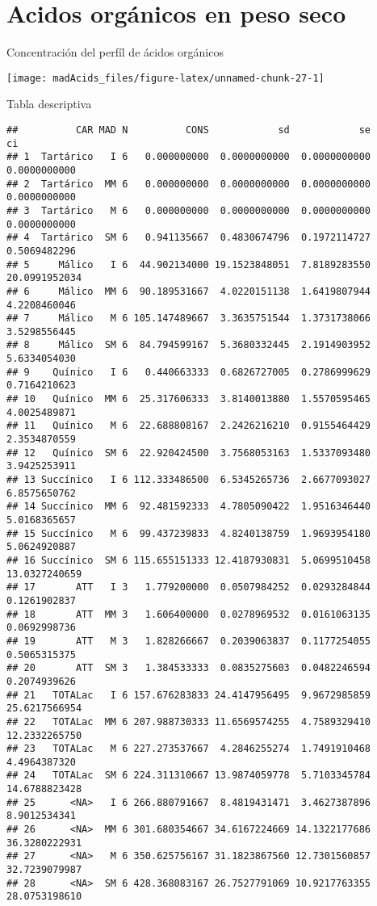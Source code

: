 \documentclass[
]{article}
\begin{document}
\section{Acidos orgánicos en peso
seco}\label{acidos-orguxe1nicos-en-peso-seco}

Concentración del perfíl de ácidos orgánicos

\begin{center}\texttt{[image: madAcids\_files/figure-latex/unnamed-chunk-27-1]} \end{center}

Tabla descriptiva

\begin{verbatim}
##          CAR MAD N          CONS            sd            se            ci
## 1  Tartárico   I 6   0.000000000  0.0000000000  0.0000000000  0.0000000000
## 2  Tartárico  MM 6   0.000000000  0.0000000000  0.0000000000  0.0000000000
## 3  Tartárico   M 6   0.000000000  0.0000000000  0.0000000000  0.0000000000
## 4  Tartárico  SM 6   0.941135667  0.4830674796  0.1972114727  0.5069482296
## 5     Málico   I 6  44.902134000 19.1523848051  7.8189283550 20.0991952034
## 6     Málico  MM 6  90.189531667  4.0220151138  1.6419807944  4.2208460046
## 7     Málico   M 6 105.147489667  3.3635751544  1.3731738066  3.5298556445
## 8     Málico  SM 6  84.794599167  5.3680332445  2.1914903952  5.6334054030
## 9    Quínico   I 6   0.440663333  0.6826727005  0.2786999629  0.7164210623
## 10   Quínico  MM 6  25.317606333  3.8140013880  1.5570595465  4.0025489871
## 11   Quínico   M 6  22.688808167  2.2426216210  0.9155464429  2.3534870559
## 12   Quínico  SM 6  22.920424500  3.7568053163  1.5337093480  3.9425253911
## 13 Succínico   I 6 112.333486500  6.5345265736  2.6677093027  6.8575650762
## 14 Succínico  MM 6  92.481592333  4.7805090422  1.9516346440  5.0168365657
## 15 Succínico   M 6  99.437239833  4.8240138759  1.9693954180  5.0624920887
## 16 Succínico  SM 6 115.655151333 12.4187930831  5.0699510458 13.0327240659
## 17       ATT   I 3   1.779200000  0.0507984252  0.0293284844  0.1261902837
## 18       ATT  MM 3   1.606400000  0.0278969532  0.0161063135  0.0692998736
## 19       ATT   M 3   1.828266667  0.2039063837  0.1177254055  0.5065315375
## 20       ATT  SM 3   1.384533333  0.0835275603  0.0482246594  0.2074939626
## 21   TOTALac   I 6 157.676283833 24.4147956495  9.9672985859 25.6217566954
## 22   TOTALac  MM 6 207.988730333 11.6569574255  4.7589329410 12.2332265750
## 23   TOTALac   M 6 227.273537667  4.2846255274  1.7491910468  4.4964387320
## 24   TOTALac  SM 6 224.311310667 13.9874059778  5.7103345784 14.6788823428
## 25      <NA>   I 6 266.880791667  8.4819431471  3.4627387896  8.9012534341
## 26      <NA>  MM 6 301.680354667 34.6167224669 14.1322177686 36.3280222931
## 27      <NA>   M 6 350.625756167 31.1823867560 12.7301560857 32.7239079987
## 28      <NA>  SM 6 428.368083167 26.7527791069 10.9217763355 28.0753198610
\end{verbatim}
\end{document}
